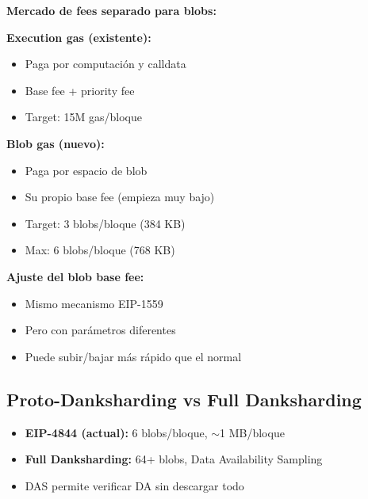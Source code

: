 \documentclass[11pt,a4paper,twoside,openright]{book}
\theoremstyle{definition}
\theoremstyle{plain}
\theoremstyle{remark}
\begin{document}
\begin{keyidea}
\textbf{Mercado de fees separado para blobs:}

\textbf{Execution gas (existente):}
\begin{itemize}
    \item Paga por computación y calldata
    \item Base fee + priority fee
    \item Target: 15M gas/bloque
\end{itemize}

\textbf{Blob gas (nuevo):}
\begin{itemize}
    \item Paga por espacio de blob
    \item Su propio base fee (empieza muy bajo)
    \item Target: 3 blobs/bloque (384 KB)
    \item Max: 6 blobs/bloque (768 KB)
\end{itemize}

\textbf{Ajuste del blob base fee:}
\begin{itemize}
    \item Mismo mecanismo EIP-1559
    \item Pero con parámetros diferentes
    \item Puede subir/bajar más rápido que el normal
\end{itemize}
\end{keyidea}

\subsection{Proto-Danksharding vs Full Danksharding}

\begin{itemize}
    \item \textbf{EIP-4844 (actual):} 6 blobs/bloque, $\sim$1 MB/bloque
    \item \textbf{Full Danksharding:} 64+ blobs, Data Availability Sampling
    \item DAS permite verificar DA sin descargar todo
\end{itemize}
\end{document}
